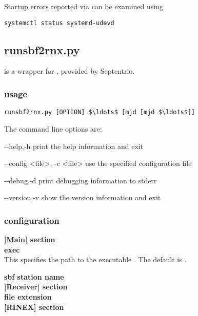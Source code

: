 Startup errors reported via  can be examined using
\begin{lstlisting}
systemctl status systemd-udevd
\end{lstlisting}

\subsection{runsbf2rnx.py}

 is a wrapper for , provided by Septentrio.

\subsubsection{usage}

\begin{lstlisting}[mathescape=true]
runsbf2rnx.py [OPTION] $\ldots$ [mjd [mjd $\ldots$]]
\end{lstlisting}
The command line options are:
\begin{description*}
	\item[-{}-help,-h]	print the help information and exit
	\item[-{}-config \textless{file}\textgreater, -c \textless{file}\textgreater] use the specified configuration file 
	\item[-{}-debug,-d]	print debugging information to stderr
	\item[-{}-version,-v] show the version information and exit
\end{description*}

\subsubsection{configuration}

{\bfseries [Main] section}\\

{\bfseries exec}\\
This specifies the path to the executable .
The default is .

{\bfseries sbf station name}\\

{\bfseries [Receiver] section}\\

{\bfseries file extension}\\

{\bfseries [RINEX] section}\\

